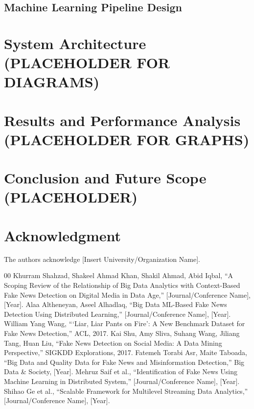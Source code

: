 \documentclass[conference]{IEEEtran}
\begin{document}
\subsection{Machine Learning Pipeline Design}

\section[System Architecture]{System Architecture (PLACEHOLDER FOR DIAGRAMS)}

\section[Results and Analysis]{Results and Performance Analysis (PLACEHOLDER FOR GRAPHS)}

\section[Conclusion]{Conclusion and Future Scope (PLACEHOLDER)}

\section*{Acknowledgment}
The authors acknowledge [Insert University/Organization Name].

\begin{thebibliography}{00}
 Khurram Shahzad, Shakeel Ahmad Khan, Shakil Ahmad, Abid Iqbal, ``A Scoping Review of the Relationship of Big Data Analytics with Context-Based Fake News Detection on Digital Media in Data Age,'' [Journal/Conference Name], [Year].
 Alaa Altheneyan, Aseel Alhadlaq, ``Big Data ML-Based Fake News Detection Using Distributed Learning,'' [Journal/Conference Name], [Year].
 William Yang Wang, ```Liar, Liar Pants on Fire': A New Benchmark Dataset for Fake News Detection,'' ACL, 2017.
 Kai Shu, Amy Sliva, Suhang Wang, Jiliang Tang, Huan Liu, ``Fake News Detection on Social Media: A Data Mining Perspective,'' SIGKDD Explorations, 2017.
 Fatemeh Torabi Asr, Maite Taboada, ``Big Data and Quality Data for Fake News and Misinformation Detection,'' Big Data \& Society, [Year].
 Mehruz Saif et al., ``Identification of Fake News Using Machine Learning in Distributed System,'' [Journal/Conference Name], [Year].
 Shihao Ge et al., ``Scalable Framework for Multilevel Streaming Data Analytics,'' [Journal/Conference Name], [Year].
\end{thebibliography}
\end{document}
